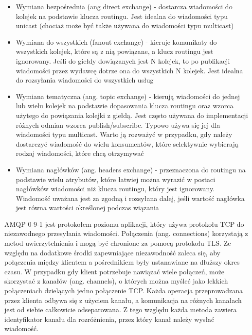 \documentclass[11pt, a4]{article} %
\begin{document}
\begin{itemize} %
    \item Wymiana bezpośrednia (ang direct exchange) - dostarcza wiadomości do kolejek 
    na podstawie klucza routingu. Jest idealna do wiadomości typu unicast 
    (chociaż może być także używana do wiadomości typu multicast)
    \item Wymiana do wszystkich (fanout exchange) - kieruje komunikaty do wszystkich 
    kolejek, które są z nią powiązane, a klucz routingu jest ignorowany. Jeśli do 
    giełdy dowiązanych jest N kolejek, to po publikacji wiadomości przez wydawcę 
    dotrze ona do wszystkich N kolejek. Jest idealna do rozsyłania wiadomości do 
    wszystkich usług
    \item Wymiana tematyczna (ang. topic exchange) - kierują wiadomości do jednej lub 
    wielu kolejek na podstawie dopasowania klucza routingu oraz wzorca użytego do 
    powiązania kolejki z giełdą. Jest często używana do implementacji różnych odmian 
    wzorca publish/subscribe. Typowo używa się jej dla wiadomości typu multicast. 
    Warto ją rozważyć w przypadku, gdy należy dostarczyć wiadomość do wielu 
    konsumentów, które selektywnie wybierają rodzaj wiadomości, które chcą otrzymywać
    \item Wymiana nagłówków (ang. headers exchange) - przeznaczona do routingu na 
    podstawie wielu atrybutów, które łatwiej można wyrazić w postaci nagłówków 
    wiadomości niż klucza routingu, który jest ignorowany. Wiadomość uważana jest za 
    zgodną i rozsyłana dalej, jeśli wartość nagłówka jest równa wartości określonej 
    podczas wiązania
\end{itemize}

AMQP 0-9-1 jest protokołem poziomu aplikacji, który używa protokołu TCP do niezawodnego 
przesyłania wiadomości. Połączenia (ang. connections) korzystają z metod 
uwierzytelnienia i mogą być chronione za pomocą protokołu TLS. Ze względu na dodatkowe 
środki zapewniające niezawodność zaleca się, aby połączenia między klientem 
a pośrednikiem były ustanawiane na dłuższy okres czasu. W przypadku gdy klient 
potrzebuje nawiązać wiele połączeń, może skorzystać z kanałów (ang. 
channels), o których można myśleć jako lekkich połączeniach dzielących jedno 
połączenie TCP. Każda operacja przeprowadzana przez klienta odbywa się z użyciem 
kanału, a komunikacja na różnych kanałach jest od siebie całkowicie odseparowana. 
Z tego względu każda metoda zawiera identyfikator kanału dla rozróżnienia, przez 
który kanał należy wysłać wiadomość.
\end{document}
